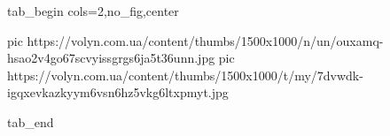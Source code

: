  
 
 
 
 


\ifcmt
  tab_begin cols=2,no_fig,center

     pic https://volyn.com.ua/content/thumbs/1500x1000/n/un/ouxamq-hsao2v4go67scvyissgrgs6ja5t36unn.jpg
		 pic https://volyn.com.ua/content/thumbs/1500x1000/t/my/7dvwdk-igqxevkazkyym6vsn6hz5vkg6ltxpmyt.jpg

  tab_end
\fi
